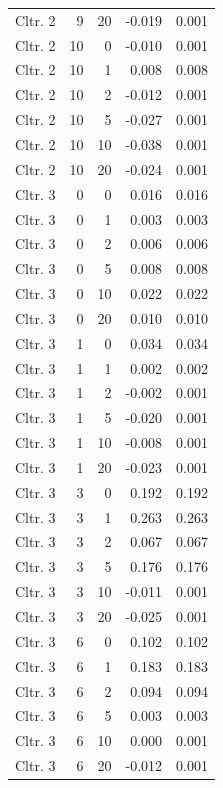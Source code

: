 \begin{longtable}{lrrrr}
  Cltr. 2 &    9 &   20 & -0.019 & 0.001 \\ 
  Cltr. 2 &   10 &    0 & -0.010 & 0.001 \\ 
  Cltr. 2 &   10 &    1 & 0.008 & 0.008 \\ 
  Cltr. 2 &   10 &    2 & -0.012 & 0.001 \\ 
  Cltr. 2 &   10 &    5 & -0.027 & 0.001 \\ 
  Cltr. 2 &   10 &   10 & -0.038 & 0.001 \\ 
  Cltr. 2 &   10 &   20 & -0.024 & 0.001 \\ 
  Cltr. 3 &    0 &    0 & 0.016 & 0.016 \\ 
  Cltr. 3 &    0 &    1 & 0.003 & 0.003 \\ 
  Cltr. 3 &    0 &    2 & 0.006 & 0.006 \\ 
  Cltr. 3 &    0 &    5 & 0.008 & 0.008 \\ 
  Cltr. 3 &    0 &   10 & 0.022 & 0.022 \\ 
  Cltr. 3 &    0 &   20 & 0.010 & 0.010 \\ 
  Cltr. 3 &    1 &    0 & 0.034 & 0.034 \\ 
  Cltr. 3 &    1 &    1 & 0.002 & 0.002 \\ 
  Cltr. 3 &    1 &    2 & -0.002 & 0.001 \\ 
  Cltr. 3 &    1 &    5 & -0.020 & 0.001 \\ 
  Cltr. 3 &    1 &   10 & -0.008 & 0.001 \\ 
  Cltr. 3 &    1 &   20 & -0.023 & 0.001 \\ 
  Cltr. 3 &    3 &    0 & 0.192 & 0.192 \\ 
  Cltr. 3 &    3 &    1 & 0.263 & 0.263 \\ 
  Cltr. 3 &    3 &    2 & 0.067 & 0.067 \\ 
  Cltr. 3 &    3 &    5 & 0.176 & 0.176 \\ 
  Cltr. 3 &    3 &   10 & -0.011 & 0.001 \\ 
  Cltr. 3 &    3 &   20 & -0.025 & 0.001 \\ 
  Cltr. 3 &    6 &    0 & 0.102 & 0.102 \\ 
  Cltr. 3 &    6 &    1 & 0.183 & 0.183 \\ 
  Cltr. 3 &    6 &    2 & 0.094 & 0.094 \\ 
  Cltr. 3 &    6 &    5 & 0.003 & 0.003 \\ 
  Cltr. 3 &    6 &   10 & 0.000 & 0.001 \\ 
  Cltr. 3 &    6 &   20 & -0.012 & 0.001 \\ 

\end{longtable}
